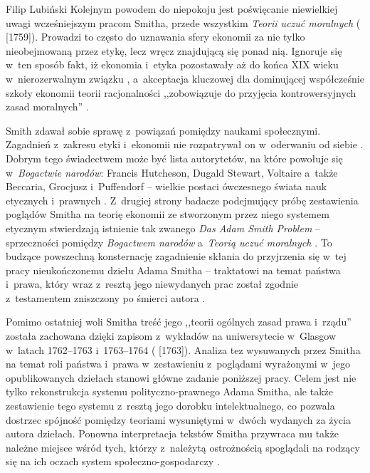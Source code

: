 \begin{artplenv}{Filip Lubiński}
Kolejnym powodem do niepokoju jest poświęcanie niewielkiej uwagi wcześniejszym pracom Smitha, przede wszystkim
\textit{Teorii uczuć moralnych}
(\cite{smith_teoria_1989} [1759]).
Prowadzi to często do uznawania sfery
ekonomii za nie tylko nieobejmowaną przez etykę, lecz wręcz znajdującą się ponad nią. Ignoruje się w~ten sposób fakt,
iż ekonomia i~etyka pozostawały aż do końca XIX wieku w~nierozerwalnym związku
\parencite[s.~235]{rawls_wyklady_2010},
a~akceptacja kluczowej dla dominującej współcześnie szkoły ekonomii teorii racjonalności ,,zobowiązuje do
przyjęcia kontrowersyjnych zasad moralnych''
\parencites[s.~50]{hausman_etyka_2017,turek_2019}.

Smith zdawał sobie sprawę z~powiązań pomiędzy naukami społecznymi. Zagadnień z~zakresu etyki i~ekonomii nie
rozpatrywał on w~oderwaniu od siebie
\parencite[s.~130]{soll_reckoning:_2014}.
Dobrym tego świadectwem może być
lista autorytetów, na które powołuje się w~\textit{Bogactwie narodów}: Francis Hutcheson, Dugald Stewart,
Voltaire a~także Beccaria, Grocjusz i~Puffendorf -- wielkie postaci ówczesnego świata nauk etycznych i~prawnych
\parencite[s.~654]{boorstin_discoverers:_1983}.
Z~drugiej strony badacze podejmujący próbę zestawienia poglądów
Smitha na teorię ekonomii ze stworzonym przez niego systemem etycznym stwierdzają istnienie tak zwanego \textit{Das
Adam Smith Problem} -- sprzeczności pomiędzy \textit{Bogactwem narodów} a~\textit{Teorią uczuć moralnych}
\parencites[s.~215–216]{sedlacek_ekonomia_2012, turek_2019}.
To budzące powszechną konsternację zagadnienie skłania do
przyjrzenia się w~tej pracy nieukończonemu dziełu Adama Smitha -- traktatowi na temat państwa i~prawa, który
wraz z~resztą jego niewydanych prac został zgodnie z~testamentem zniszczony po śmierci autora
\parencite[s.~140]{buchan_adam_2008}.

Pomimo ostatniej woli Smitha treść jego ,,teorii ogólnych zasad prawa i~rządu'' została zachowana dzięki
zapisom z~wykładów na uniwersytecie w~Glasgow w~latach 1762--1763 i~1763--1764
(\cite{smith_lectures_1982} [1763]).
Analiza tez wysuwanych przez Smitha na temat roli państwa i~prawa w~zestawieniu z~poglądami wyrażonymi w~jego
opublikowanych dziełach stanowi główne zadanie poniższej pracy. Celem jest nie tylko rekonstrukcja systemu
polityczno-prawnego Adama Smitha, ale także zestawienie tego systemu z~resztą jego dorobku intelektualnego, co pozwala
dostrzec spójność pomiędzy teoriami wysuniętymi w~dwóch wydanych za życia autora dziełach. Ponowna interpretacja
tekstów Smitha przywraca mu także należne miejsce wśród tych, którzy z~należytą ostrożnością spoglądali na rodzący się
na ich oczach system społeczno-gospodarczy
\parencite[s.~83]{ferguson_wielka_2017}.



\end{artplenv}
